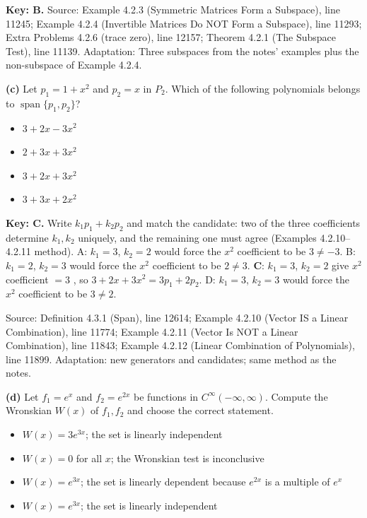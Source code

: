 \documentclass[11pt,a4paper]{article}
\newcommand{\Src}[1]{{\footnotesize\color{black!65}Source: #1}}
\begin{document}
\textbf{Key: B.} \Src{Example 4.2.3 (Symmetric Matrices Form a Subspace), line 11245; Example 4.2.4 (Invertible Matrices Do NOT Form a Subspace), line 11293; Extra Problems 4.2.6 (trace zero), line 12157; Theorem 4.2.1 (The Subspace Test), line 11139. Adaptation: Three subspaces from the notes' examples plus the non-subspace of Example 4.2.4.}\par
{}\textbf{(c)} Let $p_1=1+x^{2}$ and $p_2=x$ in $P_2$. Which of the following polynomials belongs to $\operatorname{span}\{p_1,p_2\}$?\par
\begin{itemize}[leftmargin=8mm,itemsep=0pt]\item[A] $3+2x-3x^{2}$\item[B] $2+3x+3x^{2}$\item[C$^{\ast}$] $3+2x+3x^{2}$\item[D] $3+3x+2x^{2}$\end{itemize}
\textbf{Key: C.} Write $k_1p_1+k_2p_2$ and match the candidate: two of the three coefficients determine $k_1,k_2$ uniquely, and the remaining one must agree (Examples 4.2.10--4.2.11 method). A: $k_1=3$, $k_2=2$ would force the $x^{2}$ coefficient to be $3\neq-3$. B: $k_1=2$, $k_2=3$ would force the $x^{2}$ coefficient to be $2\neq3$. \textbf{C}: $k_1=3$, $k_2=2$ give $x^{2}$ coefficient $=3$ \checkmark, so $3+2x+3x^{2}=3p_1+2p_2$. D: $k_1=3$, $k_2=3$ would force the $x^{2}$ coefficient to be $3\neq2$.\par
\Src{Definition 4.3.1 (Span), line 12614; Example 4.2.10 (Vector IS a Linear Combination), line 11774; Example 4.2.11 (Vector Is NOT a Linear Combination), line 11843; Example 4.2.12 (Linear Combination of Polynomials), line 11899. Adaptation: new generators and candidates; same method as the notes.}\par
{}\textbf{(d)} Let $f_1=e^{x}$ and $f_2=e^{2x}$ be functions in $C^{\infty}(-\infty,\infty)$. Compute the Wronskian $W(x)$ of $f_1,f_2$ and choose the correct statement.\par
\begin{itemize}[leftmargin=8mm,itemsep=0pt]\item[A] $W(x)=3e^{3x}$; the set is linearly independent\item[B] $W(x)=0$ for all $x$; the Wronskian test is inconclusive\item[C] $W(x)=e^{3x}$; the set is linearly dependent because $e^{2x}$ is a multiple of $e^{x}$\item[D$^{\ast}$] $W(x)=e^{3x}$; the set is linearly independent\end{itemize}
\end{document}
